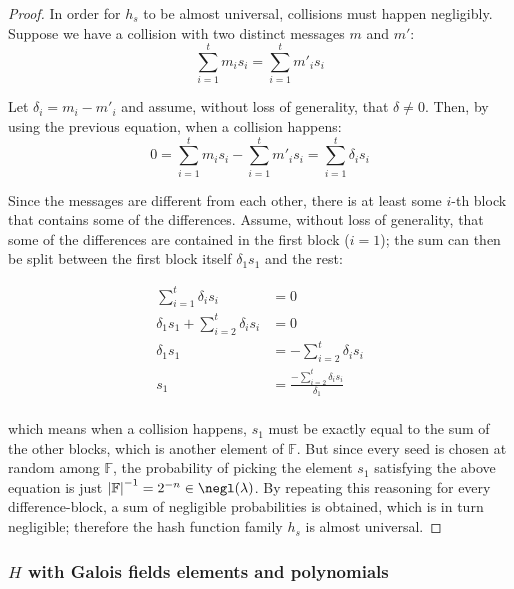\begin{proof}

    In order for $h_s$ to be almost universal, collisions must happen negligibly. Suppose we have a collision with two distinct messages $m$ and $m'$:
    \[
        \sum_{i = 1}^t m_i s_i = \sum_{i = 1}^t m'_i s_i
    \]

    Let $\delta_i = m_i - m'_i$ and assume, without loss of generality, that $\delta \neq 0$. Then, by using the previous equation, when a collision happens:
    \[
        0 = \sum_{i = 1}^t m_i s_i - \sum_{i = 1}^t m'_i s_i = \sum_{i = 1}^t \delta_i s_i
    \]

    Since the messages are different from each other, there is at least some $i$-th block that contains some of the differences. Assume, without loss of generality, that some of the differences are contained in the first block ($i = 1$); the sum can then be split between the first block itself $\delta_1 s_1$ and the rest:

    \begin{align*}
        \sum_{i = 1}^t \delta_i s_i                     &= 0                                                \\
        \delta_1 s_1 + \sum_{i = 2}^{t} \delta_i s_i    &= 0                                                \\
        \delta_ 1 s_1                                   &= -\sum_{i = 2}^{t} \delta_i s_i                   \\
        s_1                                             &= \frac{-\sum_{i = 2}^{t} \delta_i s_i}{\delta_1}  \\
    \end{align*}

    which means when a collision happens, $s_1$ must be exactly equal to the sum of the other blocks, which is another element of $\mathbb{F}$. But since every seed is chosen at random among $\mathbb{F}$, the probability of picking the element $s_1$ satisfying the above equation is just $\left|\mathbb{F}\right|^{-1} = 2^{-n} \in \negl(\lambda)$. By repeating this reasoning for every difference-block, a sum of negligible probabilities is obtained, which is in turn negligible; therefore the hash function family $h_s$ is almost universal.

\end{proof}

\subsubsection{$H$ with Galois fields elements and polynomials}

